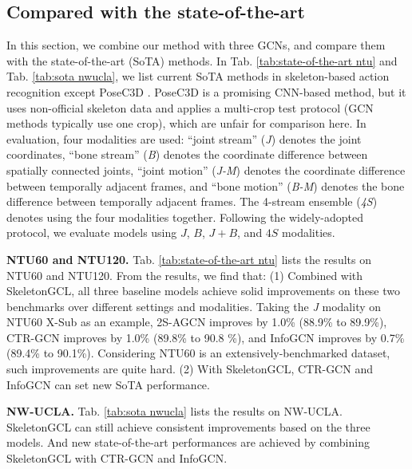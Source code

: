 \documentclass{article} \usepackage{iclr2023_conference,times}
\begin{document}
\subsection{Compared with the state-of-the-art}
In this section, we combine our method with three GCNs, and compare them with the state-of-the-art (SoTA) methods. In Tab. \ref{tab:state-of-the-art ntu} and Tab. \ref{tab:sota nwucla}, we list current SoTA methods in skeleton-based action recognition except PoseC3D \citep{posec3d}. PoseC3D is a promising CNN-based method, but it uses non-official skeleton data and applies a multi-crop test protocol (GCN methods typically use one crop), which are unfair for comparison here. In evaluation, four modalities are used: ``joint stream'' (\textit{J}) denotes the joint coordinates, ``bone stream'' (\textit{B}) denotes the coordinate difference between spatially connected joints, ``joint motion'' (\textit{J-M}) denotes the coordinate difference between temporally adjacent frames, and ``bone motion'' (\textit{B-M}) denotes the bone difference between temporally adjacent frames. The 4-stream ensemble (\textit{4S}) denotes using the four modalities together. 
Following the widely-adopted protocol, we evaluate models using $J$, $B$, $J+B$, and $4S$ modalities.

\noindent \textbf{NTU60 and NTU120.} Tab. \ref{tab:state-of-the-art ntu} lists the results on NTU60 and NTU120. From the results, we find that: (1) Combined with SkeletonGCL, all three baseline models achieve solid improvements on these two benchmarks over different settings and modalities. Taking the \textit{J} modality on NTU60 X-Sub as an example, 2S-AGCN improves by 1.0\% (88.9\% to 89.9\%), CTR-GCN improves by 1.0\% (89.8\% to 90.8 \%), and InfoGCN improves by 0.7\% (89.4\% to 90.1\%). Considering NTU60 is an extensively-benchmarked dataset, such improvements are quite hard. (2) With SkeletonGCL, CTR-GCN and InfoGCN can set new SoTA performance.

\noindent \textbf{NW-UCLA.} Tab. \ref{tab:sota nwucla} lists the results on NW-UCLA. SkeletonGCL can still achieve consistent improvements based on the three models. And new state-of-the-art performances are achieved by combining SkeletonGCL with CTR-GCN and InfoGCN.
\end{document}
